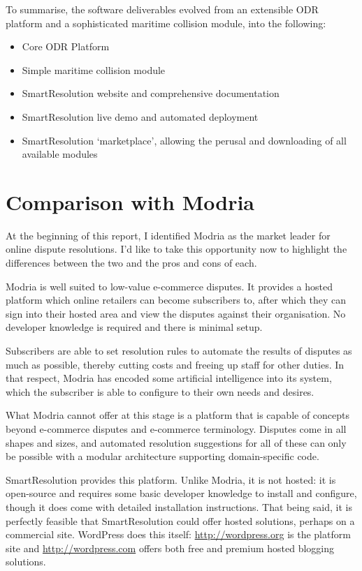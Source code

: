 To summarise, the software deliverables evolved from an extensible ODR platform and a sophisticated maritime collision module, into the following:

\begin{itemize}
\item Core ODR Platform
\item Simple maritime collision module
\item SmartResolution website and comprehensive documentation
\item SmartResolution live demo and automated deployment
\item SmartResolution `marketplace', allowing the perusal and downloading of all available modules
\end{itemize}

\section{Comparison with Modria}

At the beginning of this report, I identified Modria as the market leader for online dispute resolutions. I'd like to take this opportunity now to highlight the differences between the two and the pros and cons of each.

Modria is well suited to low-value e-commerce disputes. It provides a hosted platform which online retailers can become subscribers to, after which they can sign into their hosted area and view the disputes against their organisation. No developer knowledge is required and there is minimal setup.

Subscribers are able to set resolution rules to automate the results of disputes as much as possible, thereby cutting costs and freeing up staff for other duties. In that respect, Modria has encoded some artificial intelligence into its system, which the subscriber is able to configure to their own needs and desires.

What Modria cannot offer at this stage is a platform that is capable of concepts beyond e-commerce disputes and e-commerce terminology. Disputes come in all shapes and sizes, and  automated resolution suggestions for all of these can only be possible with a modular architecture supporting domain-specific code.

SmartResolution provides this platform. Unlike Modria, it is not hosted: it is open-source and requires some basic developer knowledge to install and configure, though it does come with detailed installation instructions. That being said, it is perfectly feasible that SmartResolution could offer hosted solutions, perhaps on a commercial site. WordPress does this itself: \url{http://wordpress.org} is the platform site and \url{http://wordpress.com} offers both free and premium hosted blogging solutions.

